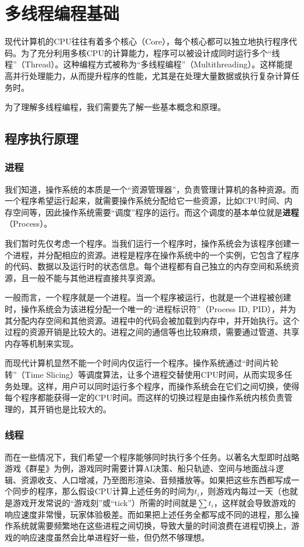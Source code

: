 \chapter{多线程编程基础}

现代计算机的CPU往往有着多个核心（Core），每个核心都可以独立地执行程序代码。为了充分利用多核CPU的计算能力，程序可以被设计成同时运行多个“线程”（Thread）。这种编程方式被称为“多线程编程”（Multithreading）。这样能提高并行处理能力，从而提升程序的性能，尤其是在处理大量数据或执行复杂计算任务时。

为了理解多线程编程，我们需要先了解一些基本概念和原理。

\section{程序执行原理}

\subsection{进程}

我们知道，操作系统的本质是一个“资源管理器”，负责管理计算机的各种资源。而一个程序希望运行起来，就需要操作系统分配给它一些资源，比如CPU时间、内存空间等，因此操作系统需要“调度”程序的运行。而这个调度的基本单位就是\textbf{进程}（Process）。

我们暂时先仅考虑一个程序。当我们运行一个程序时，操作系统会为该程序创建一个进程，并分配相应的资源。进程是程序在操作系统中的一个实例，它包含了程序的代码、数据以及运行时的状态信息。每个进程都有自己独立的内存空间和系统资源，且一般不能与其他进程直接共享资源。

一般而言，一个程序就是一个进程。当一个程序被运行，也就是一个进程被创建时，操作系统会为该进程分配一个唯一的“进程标识符”（Process ID, PID），并为其分配内存空间和其他资源。进程中的代码会被加载到内存中，并开始执行。这个过程的资源开销是比较大的。进程之间的通信等也比较麻烦，需要通过管道、共享内存等机制来实现。

而现代计算机显然不能一个时间内仅运行一个程序。操作系统通过“时间片轮转”（Time Slicing）等调度算法，让多个进程交替使用CPU时间，从而实现多任务处理。这样，用户可以同时运行多个程序，而操作系统会在它们之间切换，使得每个程序都能获得一定的CPU时间。而这样的切换过程是由操作系统内核负责管理的，其开销也是比较大的。

\subsection{线程}

而在一些情况下，我们希望一个程序能够同时执行多个任务。以著名大型即时战略游戏《群星》为例，游戏同时需要计算AI决策、船只轨迹、空间与地面战斗逻辑、资源收支、人口增减，乃至图形渲染、音频播放等。如果把这些东西都写成一个同步的程序，那么假设CPU计算上述任务的时间为$t_i$，则游戏内每过一天（也就是游戏开发常说的“游戏刻”或“tick”）所需的时间就是$\sum t_i$，这样就会导致游戏的响应速度非常慢，玩家体验极差。而如果把上述任务全都写成不同的进程，那么操作系统就需要频繁地在这些进程之间切换，导致大量的时间浪费在进程切换上，游戏的响应速度虽然会比单进程好一些，但仍然不够理想。

